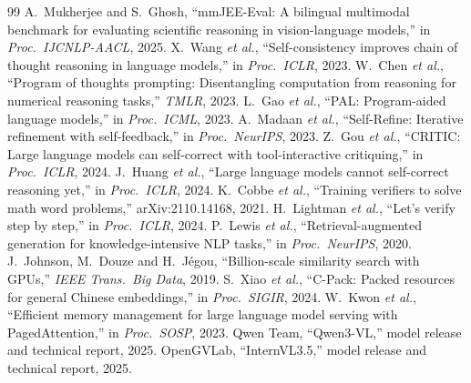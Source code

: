 \documentclass[conference]{IEEEtran}
\begin{document}
\clearpage
\begin{thebibliography}{99}\footnotesize
{} A.~Mukherjee and S.~Ghosh, ``mmJEE-Eval: A bilingual multimodal benchmark for
evaluating scientific reasoning in vision-language models,'' in \emph{Proc.\ IJCNLP-AACL}, 2025.
 X.~Wang \emph{et al.}, ``Self-consistency improves chain of thought
reasoning in language models,'' in \emph{Proc.\ ICLR}, 2023.
 W.~Chen \emph{et al.}, ``Program of thoughts prompting: Disentangling computation
from reasoning for numerical reasoning tasks,'' \emph{TMLR}, 2023.
 L.~Gao \emph{et al.}, ``PAL: Program-aided language models,'' in \emph{Proc.\
ICML}, 2023.
 A.~Madaan \emph{et al.}, ``Self-Refine: Iterative refinement with
self-feedback,'' in \emph{Proc.\ NeurIPS}, 2023.
 Z.~Gou \emph{et al.}, ``CRITIC: Large language models can self-correct with
tool-interactive critiquing,'' in \emph{Proc.\ ICLR}, 2024.
 J.~Huang \emph{et al.}, ``Large language models cannot self-correct
reasoning yet,'' in \emph{Proc.\ ICLR}, 2024.
 K.~Cobbe \emph{et al.}, ``Training verifiers to solve math word problems,''
arXiv:2110.14168, 2021.
 H.~Lightman \emph{et al.}, ``Let's verify step by step,'' in \emph{Proc.\
ICLR}, 2024.
\bibitem{rag} P.~Lewis \emph{et al.}, ``Retrieval-augmented generation for knowledge-intensive
NLP tasks,'' in \emph{Proc.\ NeurIPS}, 2020.
\bibitem{faiss} J.~Johnson, M.~Douze and H.~J\'egou, ``Billion-scale similarity search with
GPUs,'' \emph{IEEE Trans.\ Big Data}, 2019.
\bibitem{bge} S.~Xiao \emph{et al.}, ``C-Pack: Packed resources for general Chinese
embeddings,'' in \emph{Proc.\ SIGIR}, 2024.
\bibitem{vllm} W.~Kwon \emph{et al.}, ``Efficient memory management for large language model
serving with PagedAttention,'' in \emph{Proc.\ SOSP}, 2023.
\bibitem{qwen3vl} Qwen Team, ``Qwen3-VL,'' model release and technical report, 2025.
\bibitem{internvl35} OpenGVLab, ``InternVL3.5,'' model release and technical report, 2025.
\end{thebibliography}
\end{document}
